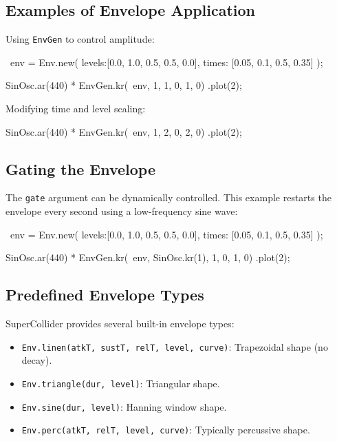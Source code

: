\subsection{Examples of Envelope Application}

Using \texttt{EnvGen} to control amplitude:

\begin{supercollider*}
~env = Env.new(
    levels:[0.0, 1.0, 0.5, 0.5, 0.0],
    times: [0.05, 0.1, 0.5, 0.35]
);

{ SinOsc.ar(440) * EnvGen.kr(~env, 1, 1, 0, 1, 0) }.plot(2);
\end{supercollider*}

Modifying time and level scaling:

\begin{supercollider*}
{ SinOsc.ar(440) * EnvGen.kr(~env, 1, 2, 0, 2, 0) }.plot(2);
\end{supercollider*}

\subsection{Gating the Envelope}

The \texttt{gate} argument can be dynamically controlled. This example restarts the envelope every second using a low-frequency sine wave:

\begin{supercollider*}
~env = Env.new(
    levels:[0.0, 1.0, 0.5, 0.5, 0.0],
    times: [0.05, 0.1, 0.5, 0.35]
);

{ SinOsc.ar(440) * EnvGen.kr(~env, SinOsc.kr(1), 1, 0, 1, 0) }.plot(2);
\end{supercollider*}

\subsection{Predefined Envelope Types}

SuperCollider provides several built-in envelope types:

\begin{itemize}
    \item \texttt{Env.linen(atkT, sustT, relT, level, curve)}: Trapezoidal shape (no decay).
    \item \texttt{Env.triangle(dur, level)}: Triangular shape.
    \item \texttt{Env.sine(dur, level)}: Hanning window shape.
    \item \texttt{Env.perc(atkT, relT, level, curve)}: Typically percussive shape.
\end{itemize}

